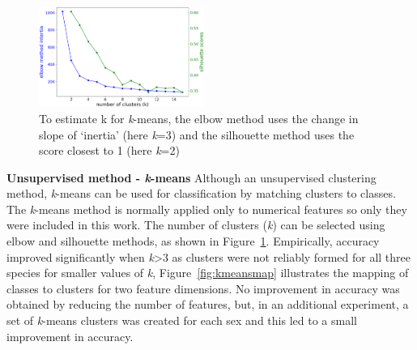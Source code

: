 \documentclass[12pt]{article}
\begin{document}
\begin{figure} %
  \centering
  \vspace{-0.5\baselineskip} %
  \includegraphics[width=0.48\textwidth]{kmeansvalue.png} %
  \vspace{-0.5\baselineskip} %
  \caption{To estimate k for \textit{k}-means, the elbow method uses the change in slope of `inertia' 
  (here \textit{k}=3) and the silhouette method uses the score closest to 1 (here \textit{k}=2)}
  \vspace{-0.5\baselineskip} %
  \label{fig:kmeansvalue}
\end{figure}

\textbf{Unsupervised method - \textit{k}-means}  
Although an unsupervised clustering method, 
\textit{k}-means can be used for classification by matching clusters to classes. 
The \textit{k}-means method is normally applied only to numerical features so only they were included in this work. 
The number of clusters (\textit{k}) can be selected using elbow and silhouette methods, 
as shown in Figure~\ref{fig:kmeansvalue}. Empirically, accuracy improved significantly when \textit{k}>3 
as clusters were not reliably formed for all three species for smaller values of \textit{k},  
Figure~\ref{fig:kmeansmap} illustrates the mapping of classes to clusters for two feature dimensions. 
No improvement in accuracy was obtained by reducing the number of features, 
but, in an additional experiment, a set of \textit{k}-means clusters was created for each sex 
and this led to a small improvement in accuracy. 
\end{document}
